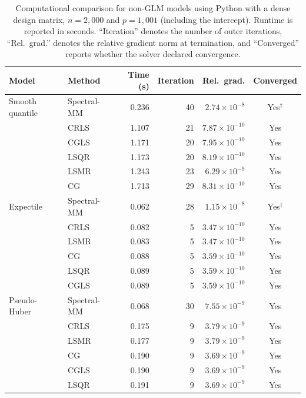 \clearpage

\begin{table}[htbp]
\centering
\small
\setlength{\tabcolsep}{4pt}
\caption{
Computational comparison for non-GLM models using Python with a dense design matrix,
$n=2{,}000$ and $p=1{,}001$ (including the intercept).
Runtime is reported in seconds. ``Iteration\textquotedblright{} denotes the number of outer iterations,
``Rel.\ grad.\textquotedblright{} denotes the relative gradient norm at termination, and
``Converged\textquotedblright{} reports whether the solver declared convergence.}
\label{tab:python-nonglm-comparison-dense}
\begin{tabular}{llrrrc}
\toprule
Model & Method & Time (s) & Iteration & Rel.\ grad. & Converged \\
\midrule

Smooth quantile
& Spectral-MM & 0.236 & 40 & $2.74\times10^{-8}$ & Yes$^{\dagger}$ \\
& CRLS & 1.107 & 21 & $7.87\times10^{-10}$ & Yes \\
& CGLS & 1.171 & 20 & $7.95\times10^{-10}$ & Yes \\
& LSQR & 1.173 & 20 & $8.19\times10^{-10}$ & Yes \\
& LSMR & 1.243 & 23 & $6.29\times10^{-9}$ & Yes \\
& CG & 1.713 & 29 & $8.31\times10^{-10}$ & Yes \\
\midrule

Expectile
& Spectral-MM & 0.062 & 28 & $1.15\times10^{-8}$ & Yes$^{\dagger}$ \\
& CRLS & 0.082 & 5 & $3.47\times10^{-10}$ & Yes \\
& LSMR & 0.083 & 5 & $3.47\times10^{-10}$ & Yes \\
& CG & 0.088 & 5 & $3.59\times10^{-10}$ & Yes \\
& LSQR & 0.089 & 5 & $3.59\times10^{-10}$ & Yes \\
& CGLS & 0.089 & 5 & $3.59\times10^{-10}$ & Yes \\
\midrule

Pseudo-Huber
& Spectral-MM & 0.068 & 30 & $7.55\times10^{-9}$ & Yes \\
& CRLS & 0.175 & 9 & $3.79\times10^{-9}$ & Yes \\
& LSMR & 0.177 & 9 & $3.79\times10^{-9}$ & Yes \\
& CG & 0.190 & 9 & $3.69\times10^{-9}$ & Yes \\
& CGLS & 0.190 & 9 & $3.69\times10^{-9}$ & Yes \\
& LSQR & 0.191 & 9 & $3.69\times10^{-9}$ & Yes \\
\midrule


\end{tabular}
\end{table}
